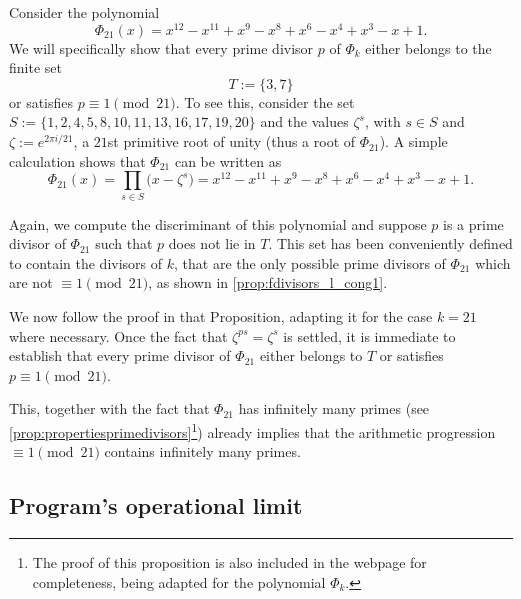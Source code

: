 \documentclass[../main.tex]{subfiles}
\begin{document}
 \begin{mdframed}\small
Consider the polynomial 
\begin{equation*}
\Phi_{21}(x)=x^{12} - x^{11} + x^{9} - x^{8} + x^{6} - x^{4} + x^{3} - x + 1.
\end{equation*}
We will specifically show that every prime divisor $p$ of $\Phi_k$ either belongs to the finite set 
\begin{equation*}
	T:=\{3, 7\}
\end{equation*}
or satisfies $p\equiv 1 \pmod{21}$. To see this, consider the set $S:=\{1, 2, 4, 5, 8, 10, 11, 13, 16, 17, 19,\allowbreak 20\}$ and the values $\zeta^{s}$, with $s\in S$ and $\zeta:=e^{2\pi i/{21}}$, a $21$st primitive root of unity (thus a root of $\Phi_{21}$). A simple calculation shows that $\Phi_{21}$ can be written as
\begin{equation*}
\Phi_{21}(x)=\displaystyle\prod_{s\in S}\big(x-\zeta^{s}\big)=x^{12} - x^{11} + x^{9} - x^{8} + x^{6} - x^{4} + x^{3} - x + 1.
\end{equation*}
\end{mdframed}

Again, we compute the discriminant of this polynomial and suppose $p$ is a prime divisor of $\Phi_{21}$ such that $p$ does not lie in $T$. This set has been conveniently defined to contain the divisors of $k$, that are the only possible prime divisors of $\Phi_{21}$ which are not $\equiv 1\pmod{21}$, as shown in \cref{prop:fdivisors_l_cong1}.

We now follow the proof in that Proposition, adapting it for the case $k=21$ where necessary. Once the fact that $\zeta^{ps}=\zeta^s$ is settled, it is immediate to establish that every prime divisor of $\Phi_{21}$ either belongs to $T$ or satisfies $p\equiv 1\pmod{21}$.

This, together with the fact that $\Phi_{21}$ has infinitely many primes (see \cref{prop:propertiesprimedivisors}\footnote{The proof of this proposition is also included in the webpage for completeness, being adapted for the polynomial $\Phi_k$.}) already implies that the arithmetic progression $\equiv 1\pmod{21}$ contains infinitely many primes. 

\subsection{Program's operational limit}\label{sec:programlimit}
\end{document}
